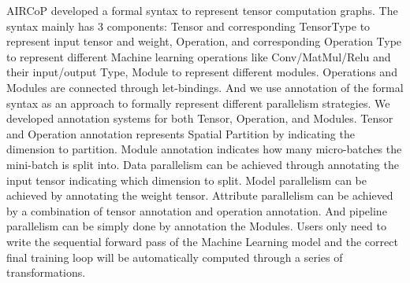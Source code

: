 \documentclass[sigplan]{acmart}\settopmatter{printfolios=true,printccs=false,printacmref=false}
\begin{document}
 AIRCoP developed a formal syntax to represent tensor computation graphs. The syntax mainly has 3 components: Tensor and corresponding TensorType to represent input tensor and weight, Operation, and corresponding Operation Type to represent different Machine learning operations like Conv/MatMul/Relu and their input/output Type, Module to represent different modules. Operations and Modules are connected through let-bindings. And we use annotation of the formal syntax as an approach to formally represent different parallelism strategies. We developed annotation systems for both Tensor, Operation, and Modules. Tensor and Operation annotation represents Spatial Partition by indicating the dimension to partition. Module annotation indicates how many micro-batches the mini-batch is split into. Data parallelism can be achieved through annotating the input tensor indicating which dimension to split. Model parallelism can be achieved by annotating the weight tensor. Attribute parallelism can be achieved by a combination of tensor annotation and operation annotation. And pipeline parallelism can be simply done by annotation the Modules. Users only need to write the sequential forward pass of the Machine Learning model and the correct final training loop will be automatically computed through a series of transformations.
\end{document}
